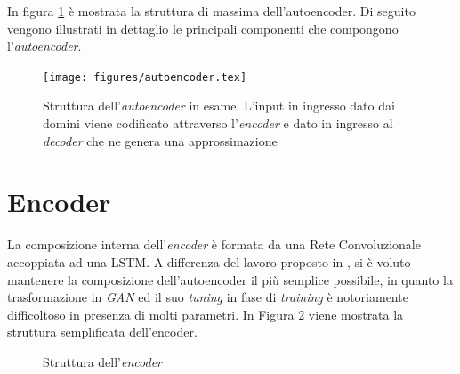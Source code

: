 In figura \ref{fig:autoencoder1} è mostrata la struttura di massima dell'autoencoder. Di seguito vengono illustrati in dettaglio le principali componenti che compongono l'\textit{autoencoder}. 

\begin{figure}[!p]
    \centering
	\texttt{[image: figures/autoencoder.tex]}
	\caption{Struttura dell'\textit{autoencoder} in esame. L'input in ingresso dato dai domini viene codificato attraverso l'\textit{encoder} e dato in ingresso al \textit{decoder} che ne genera una approssimazione}
\label{fig:autoencoder1}
\end{figure}

\section{Encoder}
\label{encoder}
La composizione interna dell'\textit{encoder} è formata da una Rete Convoluzionale accoppiata ad una LSTM. A differenza del lavoro proposto in \cite{deepdga}, si è voluto mantenere la composizione dell'autoencoder il più semplice possibile, in quanto la trasformazione in \textit{GAN} ed il suo \textit{tuning} in fase di \textit{training} è notoriamente difficoltoso in presenza di molti parametri. In Figura \ref{fig:encoder} viene mostrata la struttura semplificata dell'encoder.

\begin{figure}[!htb]
    \centering
	
	\caption{Struttura dell'\textit{encoder}}
\label{fig:encoder}
\end{figure}

